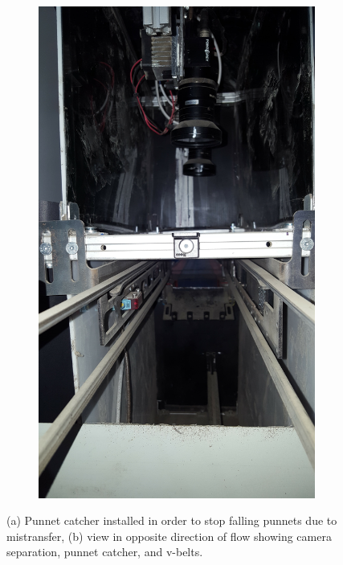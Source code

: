 \documentclass[fleqn,twoside,12pt]{report}
\begin{document}
\begin{figure}[ht]
\begin{subfigure}{.5\textwidth}
		\caption{}
		\label{fig:inside_enclosure_1}
	\end{subfigure}%
	\begin{subfigure}{.5\textwidth}
		\centering
		\includegraphics[width=\linewidth, angle=270]{inside_enclosure_2.jpg}
		\caption{}
		\label{fig:inside_enclosure_2}
	\end{subfigure}%
	
	\caption{(a) Punnet catcher installed in order to stop falling punnets due to mistransfer, (b) view in opposite direction of flow showing camera separation, punnet catcher, and v-belts.}
	\label{}
\end{figure}
\end{document}
